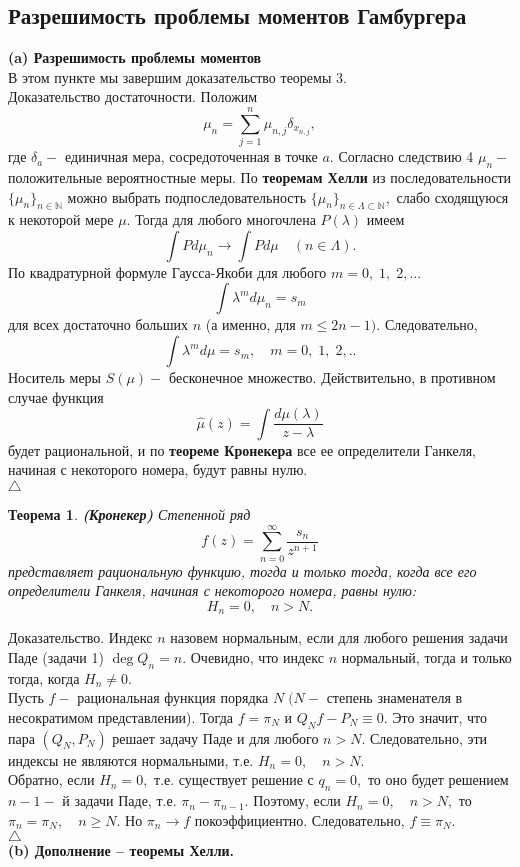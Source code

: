 \documentclass[12 pt, a4 paper]{article}
\theoremstyle{plain}   \newtheorem{Pro}{Задача}
\newtheorem{The}{Теорема}
\begin{document}
\subsection{Разрешимость проблемы моментов Гамбургера}
$ \; $
\\
{\bfseries (a) Разрешимость проблемы моментов}\\
В этом пункте мы завершим доказательство теоремы 3.\\
{\Large Доказательство достаточности.}
Положим
$$
  \mu _n =\sum _{j=1}^n \mu _{n,j} \delta _{x_{n,j}},
$$
где
$ \delta _a - $
единичная мера, сосредоточенная в точке
$ a . $
Согласно следствию 4
$ \mu _n - $
положительные вероятностные меры. По
{\bfseries теоремам Хелли}
из последовательности
$ \{ \mu _n \} _{n \in \mathbb{N}} $
можно выбрать подпоследовательность
$ \{ \mu _n \} _{n \in \Lambda \subset \mathbb{N}}, $
слабо сходящуюся к некоторой мере
$ \mu . $
Тогда для любого многочлена
$ P(\lambda ) $
имеем
$$
  \int P d \mu _n \rightarrow \int P d \mu
  \quad (n \in \Lambda ).
$$
По квадратурной формуле Гаусса-Якоби для любого
$ m=0, \; 1, \; 2,... $
$$
  \int \lambda ^m d \mu _n =s_m
$$
для всех достаточно больших
$ n $
(а именно, для
$ m \leq 2n-1 ). $
Следовательно,
$$
  \int \lambda ^m d \mu =s_m ,
  \quad m=0, \; 1, \; 2,..
$$
Носитель меры
$ S( \mu ) - $
бесконечное множество. Действительно, в противном случае функция
$$
  \hat \mu (z)=\int \frac{d \mu (\lambda )}{z-\lambda }
$$
будет рациональной, и по
{\bfseries теореме Кронекера}
все ее определители
Ганкеля, начиная с некоторого номера, будут равны нулю.\\
$ \triangle $
\begin{The}{\bfseries (Кронекер)}
Степенной ряд
$$
  f(z)= \sum _{n=0}^{\infty}
  \frac{s_n}{z^{n+1}}
$$
представляет рациональную функцию, тогда и только тогда,
когда все его определители Ганкеля, начиная с некоторого номера,
равны нулю:
$$
  H_n =0, \quad n>N.
$$
\end{The}
{\Large Доказательство.}
Индекс
$ n $
назовем нормальным, если для любого решения задачи Паде
(задачи 1)
$ \deg Q_n =n . $
Очевидно, что индекс
$ n $
нормальный, тогда и только тогда, когда
$ H_n \not =0. $
\\
Пусть
$ f - $
рациональная функция порядка
$ N \; ( N - $
степень знаменателя в несократимом представлении). Тогда
$ f=\pi _N $
и
$ Q_N f -P_N \equiv 0. $
Это значит, что пара
$ (Q_N , P_N ) $
решает задачу Паде и для любого
$ n>N . $
Следовательно, эти индексы не являются нормальными, т.е.
$ H_n =0, \quad n>N. $
\\
Обратно, если
$ H_n =0 , $
т.е. существует решение с
$ q_n =0 , $
то оно будет решением
$ n-1 - $
й задачи Паде, т.е.
$ \pi _n -\pi _{n-1} . $
Поэтому, если
$ H_n =0, \quad n>N, $
то
$ \pi _n =\pi _N , \quad n \geq N. $
Но
$ \pi _n \rightarrow f $
покоэффициентно. Следовательно,
$ f \equiv \pi _N . $
\\
$ \triangle $
\\
{\bfseries (b)    Дополнение -- теоремы Хелли.}
\\
\end{document}
